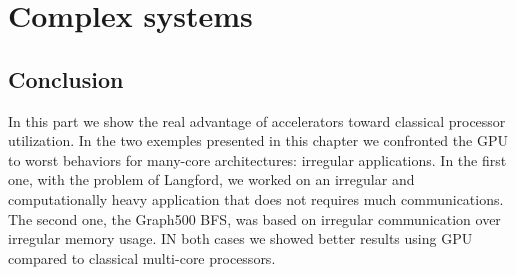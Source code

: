 \part{Complex systems}










\chapter*{Conclusion}
In this part we show the real advantage of accelerators toward classical processor utilization. 
In the two exemples presented in this chapter we confronted the GPU to worst behaviors for many-core architectures: irregular applications. 
In the first one, with the problem of Langford, we worked on an irregular and computationally heavy application that does not requires much communications. 
The second one, the Graph500 BFS, was based on irregular communication over irregular memory usage. 
IN both cases we showed better results using GPU compared to classical multi-core processors. 

